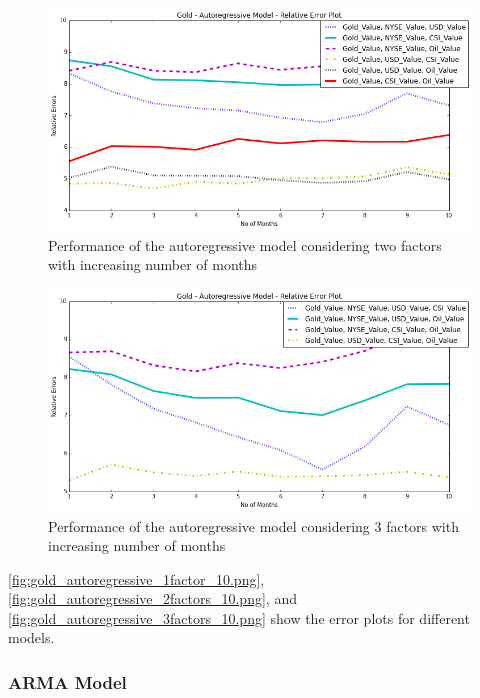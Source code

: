 \documentclass[runningheads]{llncs}
\begin{document}
\begin{figure}
\centering
\includegraphics[width=\textwidth]{gold_autoregressive_2factors_10.png}
\caption{Performance of the autoregressive model considering two factors with increasing number of months}
\label{fig:gold_autoregressive_2factors_10.png}
\end{figure}

\begin{figure}
\centering
\includegraphics[width=\textwidth]{gold_autoregressive_3factors_10.png}
\caption{Performance of the autoregressive model considering 3 factors with increasing number of months}
\label{fig:gold_autoregressive_3factors_10.png}
\end{figure}

\noindent \autoref{fig:gold_autoregressive_1factor_10.png}, \autoref{fig:gold_autoregressive_2factors_10.png}, and \autoref{fig:gold_autoregressive_3factors_10.png} show the error plots for different models. 


\newpage
\subsubsection {ARMA Model}
\end{document}
